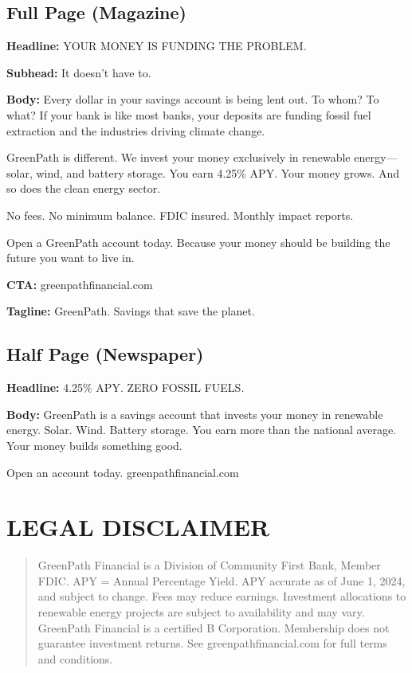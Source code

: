 \documentclass[
    language=english,
    doctype=advertising-copy,
    institution=none,
]{../../omnilatex}
\begin{document}
\subsection*{Full Page (Magazine)}

\textbf{Headline:} YOUR MONEY IS FUNDING THE PROBLEM.

\textbf{Subhead:} It doesn't have to.

\textbf{Body:} Every dollar in your savings account is being lent out. To whom? To what? If your bank is like most banks, your deposits are funding fossil fuel extraction and the industries driving climate change.

GreenPath is different. We invest your money exclusively in renewable energy---solar, wind, and battery storage. You earn 4.25\% APY. Your money grows. And so does the clean energy sector.

No fees. No minimum balance. FDIC insured. Monthly impact reports.

Open a GreenPath account today. Because your money should be building the future you want to live in.

\textbf{CTA:} greenpathfinancial.com

\textbf{Tagline:} GreenPath. Savings that save the planet.

\subsection*{Half Page (Newspaper)}

\textbf{Headline:} 4.25\% APY. ZERO FOSSIL FUELS.

\textbf{Body:} GreenPath is a savings account that invests your money in renewable energy. Solar. Wind. Battery storage. You earn more than the national average. Your money builds something good.

Open an account today. greenpathfinancial.com

\section*{LEGAL DISCLAIMER}

\begin{quote}
\small GreenPath Financial is a Division of Community First Bank, Member FDIC. APY = Annual Percentage Yield. APY accurate as of June 1, 2024, and subject to change. Fees may reduce earnings. Investment allocations to renewable energy projects are subject to availability and may vary. GreenPath Financial is a certified B Corporation. Membership does not guarantee investment returns. See greenpathfinancial.com for full terms and conditions.
\end{quote}
\end{document}
